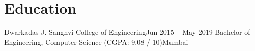 \section{Education}
    \resumeSubHeadingListStart

    \resumeSubheading
    {Dwarkadas J. Sanghvi College of Engineering}{Jun 2015 – May 2019}
    {Bachelor of Engineering, Computer Science (CGPA: 9.08 / 10)}{Mumbai}

    \resumeSubHeadingListEnd